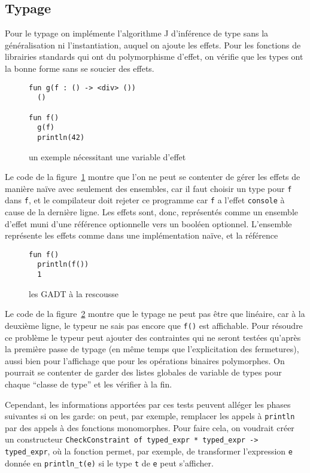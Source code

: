 \documentclass[11pt]{article}
\begin{document}
\subsection{Typage}
Pour le typage on implémente l'algorithme J d'inférence de type sans la
généralisation ni l'instantiation, auquel on ajoute les effets. Pour les
fonctions de librairies standards qui ont du polymorphisme d'effet, on vérifie
que les types ont la bonne forme sans se soucier des effets.

\begin{figure}[h]\label{code2}
\begin{verbatim}
fun g(f : () -> <div> ())
  ()

fun f()
  g(f)
  println(42)
\end{verbatim}
\caption{un exemple nécessitant une variable d'effet}
\end{figure}

Le code de la figure~\ref{code2} montre que l'on ne peut se contenter de gérer
les effets de manière naïve avec seulement des ensembles, car il faut choisir un
type pour \texttt{f} dans \texttt{f}, et le compilateur doit rejeter ce
programme car \texttt{f} a l'effet \texttt{console} à cause de la dernière
ligne. Les effets sont, donc, représentés comme un ensemble d'effet muni d'une
référence optionnelle vers un booléen optionnel. L'ensemble représente les
effets comme dans une implémentation naïve, et la référence 

\begin{figure}[h]\label{code1}
\begin{verbatim}
fun f()
  println(f())
  1
\end{verbatim}
\caption{les GADT à la rescousse}
\end{figure}

Le code de la figure~\ref{code1} montre que le typage ne peut pas être que
linéaire, car à la deuxième ligne, le typeur ne sais pas encore que \texttt{f()}
est affichable. Pour résoudre ce problème le typeur peut ajouter des contraintes
qui ne seront testées qu'après la première passe de typage (en même temps que
l'explicitation des fermetures), aussi bien pour l'affichage que pour les
opérations binaires polymorphes. On pourrait se contenter de garder des listes
globales de variable de types pour chaque ``classe de type'' et les vérifier à
la fin.

Cependant, les informations apportées par ces tests peuvent alléger les phases
suivantes si on les garde: on peut, par exemple, remplacer les appels à
\texttt{println} par des appels à des fonctions monomorphes. Pour faire cela, on
voudrait créer un constructeur \texttt{CheckConstraint of typed\_expr *
  typed\_expr -> typed\_expr}, où la fonction permet, par exemple, de
transformer l'expression \texttt{e} donnée en \texttt{println\_t(e)} si le type
\texttt{t} de \texttt{e} peut s'afficher.
\end{document}
